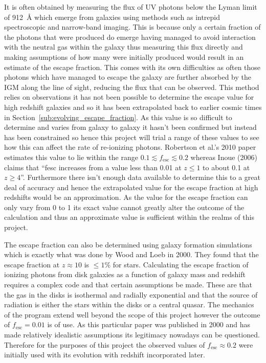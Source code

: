 			It is often obtained by measuring the flux of UV photons below the Lyman limit of \SI{912}{\angstrom} which emerge from galaxies using methods such as intrepid spectroscopic and narrow-band imaging\cite{robertson2010early}. This is because only a certain fraction of the photons that were produced do emerge having managed to avoid interaction with the neutral gas within the galaxy thus measuring this flux directly and making assumptions of how many were initially produced would result in an estimate of the escape fraction. This comes with its own difficulties as often those photons which have managed to escape the galaxy are further absorbed by the IGM along the line of sight, reducing the flux that can be observed. This method relies on observations it has not been possible to determine the escape value for high redshift galaxies and so it has been extrapolated back to earlier cosmic times in Section~\ref{sub:evolving_escape_fraction}. As this value is so difficult to determine and varies from galaxy to galaxy it hasn't been confirmed but instead has been constrained so hence this project will trial a range of these values to see how this can affect the rate of re-ionizing photons. Robertson et al.'s 2010 paper estimates this value to lie within the range $0.1\lesssim f_\text{esc}\lesssim 0.2$\cite{robertson2010early} whereas Inoue (2006) claims that ``fesc increases from a value less than 0.01 at $z\le 1$ to about 0.1 at $z\ge 4$''\cite{inoue2006escape}. Furthermore there isn't enough data available to determine this to a great deal of accuracy and hence the extrapolated value for the escape fraction at high redshifts would be an approximation. As the value for the escape fraction can only vary from 0 to 1 its exact value cannot greatly alter the outcome of the calculation and thus an approximate value is sufficient within the realms of this project.

			The escape fraction can also be determined using galaxy formation simulations which is exactly what was done by Wood and Loeb in 2000. They found that the escape fraction at $z\approx 10$ is $\le1$\% for stars\cite{gnedin2008escape}. Calculating the escape fraction of ionizing photons from disk galaxies as a function of galaxy mass and redshift requires a complex code and that certain assumptions be made. These are that the gas in the disks is isothermal and radially exponential and that the source of radiation is either the stars within the disks or a central quasar. The mechanics of the program extend well beyond the scope of this project however the outcome of $f_\text{esc}=0.01$ is of use. As this particular paper was published in 2000 and has made relatively idealistic assumptions its legitimacy nowadays can be questioned. Therefore for the purposes of this project the observed values of $f_\text{esc}\approx 0.2$ were initially used with its evolution with redshift incorporated later.

